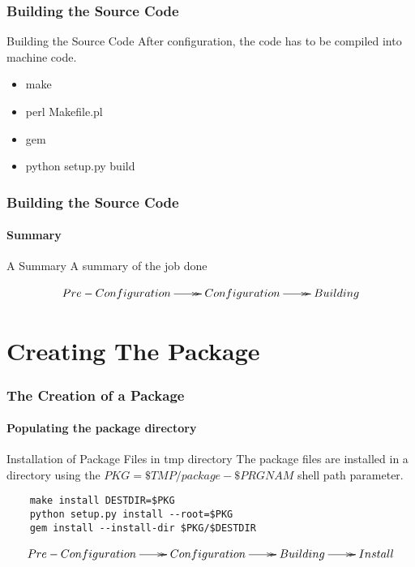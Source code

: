 \documentclass[12pt,hyperref={pdfpagelabels=true}]{beamer}
\begin{document}
\begin{frame}
  \frametitle{Building the Source Code}
  \begin{block}{Building the Source Code}
    After configuration, the code has to be compiled into machine code.
  \end{block}
  
  \pause
  
  \begin{example}
    \begin{itemize}[<+-| alert@+>]
    \item make
    \item perl Makefile.pl
    \item gem
    \item python setup.py build
    \end{itemize}
  \end{example}
\end{frame}

\begin{frame}
  \frametitle{Building the Source Code}
  \framesubtitle{Summary}
  \begin{block}{A Summary}
    A summary of the job done
  \end{block}
  \begin{equation*}
    \xymatrix@C=2pc@R=2pc{
      Pre-Configuration\ar@{->>}[r] & Configuration\ar@{->>}[r] & Building}
  \end{equation*}
\end{frame}

\section{Creating The Package}

\begin{frame}[fragile]
  \frametitle{The Creation of a Package}
  \framesubtitle{Populating the package directory}
  \begin{block}{Installation of Package Files in tmp directory}
    The package files are installed in a directory using the
    $PKG=\$TMP/package-\$PRGNAM$ shell path parameter.
  \end{block}
  
  \pause
  
  \begin{lstlisting}
    make install DESTDIR=$PKG
    python setup.py install --root=$PKG
    gem install --install-dir $PKG/$DESTDIR
  \end{lstlisting}
  
  \pause
  
  \begin{equation*}
    \xymatrix@C=2pc@R=2pc{
      Pre-Configuration\ar@{->>}[r] & Configuration\ar@{->>}[r] &
      Building\ar@{->>}[r] & Install}
  \end{equation*}
\end{frame}
\end{document}
